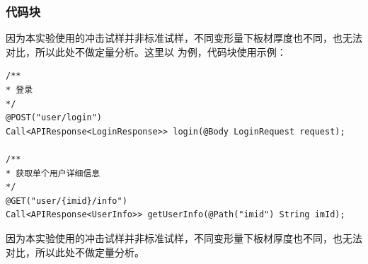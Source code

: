 		\subsubsection{代码块}
		
		因为本实验使用的冲击试样并非标准试样，不同变形量下板材厚度也不同，也无法对比，所以此处不做定量分析。这里以 为例，代码块使用示例：
		\vspace{-0.8em}
		\begin{lstlisting}[caption=APIService , label=code_api_service]
/** 
* 登录 
*/
@POST("user/login")
Call<APIResponse<LoginResponse>> login(@Body LoginRequest request);

/** 
* 获取单个用户详细信息
*/
@GET("user/{imid}/info")
Call<APIResponse<UserInfo>> getUserInfo(@Path("imid") String imId);
		\end{lstlisting}
		\vspace{-0.5em}
	    因为本实验使用的冲击试样并非标准试样，不同变形量下板材厚度也不同，也无法对比，所以此处不做定量分析。\par   
 \clearpage